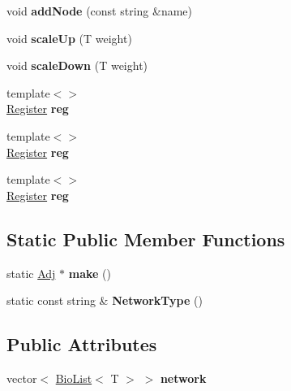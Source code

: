 \begin{DoxyCompactItemize}
void {\bfseries add\+Node} (const string \&name)
\item 
\mbox{\label{class_bio_adj_list_a577d7d2b8ae0a2aff92c3869b1ada7e7}} 
void {\bfseries scale\+Up} (T weight)
\item 
\mbox{\label{class_bio_adj_list_ac58f95732c9734d83f96d9991cd9271e}} 
void {\bfseries scale\+Down} (T weight)
\item 
\mbox{\label{class_bio_adj_list_a1eb61b9956cc97c57ee161b5ea0a299b}} 
{\footnotesize template$<$$>$ }\\\hyperlink{struct_register}{Register} {\bfseries reg}
\item 
\mbox{\label{class_bio_adj_list_a54b48c0689bd7e3383da7f623d62b092}} 
{\footnotesize template$<$$>$ }\\\hyperlink{struct_register}{Register} {\bfseries reg}
\item 
\mbox{\label{class_bio_adj_list_a8230cad786e8bff1de69573946f1bcba}} 
{\footnotesize template$<$$>$ }\\\hyperlink{struct_register}{Register} {\bfseries reg}
\end{DoxyCompactItemize}
\subsection*{Static Public Member Functions}
\begin{DoxyCompactItemize}
\item 
\mbox{\label{class_bio_adj_list_a3e19dd177e321cf1d92d79ca0d6eb803}} 
static \hyperlink{class_adj}{Adj} $\ast$ {\bfseries make} ()
\item 
\mbox{\label{class_bio_adj_list_a21a9052f63e290eb396586119adb3d20}} 
static const string \& {\bfseries Network\+Type} ()
\end{DoxyCompactItemize}
\subsection*{Public Attributes}
\begin{DoxyCompactItemize}
\item 
\mbox{\label{class_bio_adj_list_a52c00ae12aa725e4faa43059bb1c4ec7}} 
vector$<$ \hyperlink{class_bio_list}{Bio\+List}$<$ T $>$ $>$ {\bfseries network}
\end{DoxyCompactItemize}
